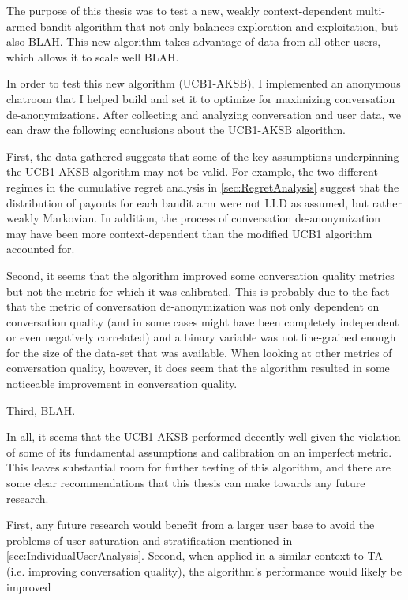 The purpose of this thesis was to test a new, weakly context-dependent multi-armed bandit algorithm that not only balances exploration and exploitation, but also BLAH. This new algorithm takes advantage of data from all other users, which allows it to scale well BLAH. 

In order to test this new algorithm (UCB1-AKSB), I implemented an anonymous chatroom that I helped build and set it to optimize for maximizing conversation de-anonymizations. After collecting and analyzing conversation and user data, we can draw the following conclusions about the UCB1-AKSB algorithm. 

First, the data gathered suggests that some of the key assumptions underpinning the UCB1-AKSB algorithm may not be valid. For example, the two different regimes in the cumulative regret analysis in \autoref{sec:RegretAnalysis} suggest that the distribution of payouts for each bandit arm were not I.I.D as assumed, but rather weakly Markovian. In addition, the process of conversation de-anonymization may have been more context-dependent than the modified UCB1 algorithm accounted for.

Second, it seems that the algorithm improved some conversation quality metrics but not the metric for which it was calibrated. This is probably due to the fact that the metric of conversation de-anonymization was not only dependent on conversation quality (and in some cases might have been completely independent or even negatively correlated) and a binary variable was not fine-grained enough for the size of the data-set that was available. When looking at other metrics of conversation quality, however, it does seem that the algorithm resulted in some noticeable improvement in conversation quality.

Third, BLAH.

In all, it seems that the UCB1-AKSB performed decently well given the violation of some of its fundamental assumptions and calibration on an imperfect metric. This leaves substantial room for further testing of this algorithm, and there are some clear recommendations that this thesis can make towards any future research. 

First, any future research would benefit from a larger user base to avoid the problems of user saturation and stratification mentioned in \autoref{sec:IndividualUserAnalysis}. Second, when applied in a similar context to TA (i.e. improving conversation quality), the algorithm's performance would likely be improved 

